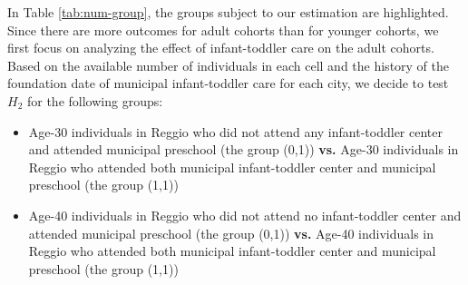 \begin{table}[H] \caption{Number of Individuals in Each Group} \label{tab:num-group}
\end{table}

In Table \ref{tab:num-group}, the groups subject to our estimation are highlighted. Since there are more outcomes for adult cohorts than for younger cohorts, we first focus on analyzing the effect of infant-toddler care on the adult cohorts. Based on the available number of individuals in each cell and the history of the foundation date of municipal infant-toddler care for each city, we decide to test $H_2$ for the following groups:
\begin{itemize}
\item Age-30 individuals in Reggio who did not attend any infant-toddler center and attended municipal preschool (the group (0,1)) \textbf{vs.} Age-30 individuals in Reggio who attended both municipal infant-toddler center and municipal preschool (the group (1,1))
\item Age-40 individuals in Reggio who did not attend no infant-toddler center and attended municipal preschool (the group (0,1)) \textbf{vs.} Age-40 individuals in Reggio who attended both municipal infant-toddler center and municipal preschool (the group (1,1))
\end{itemize}

